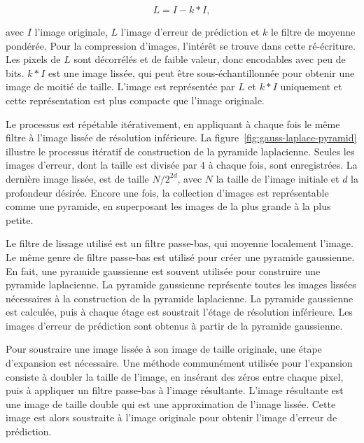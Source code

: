 \begin{equation}
    L = I - k * I,
\end{equation}

avec $I$ l'image originale, $L$ l'image d'erreur de prédiction et $k$ le filtre de moyenne pondérée. Pour la compression d'images, l'intérêt se trouve dans cette ré-écriture. Les pixels de $L$ sont décorrélés et de faible valeur, donc encodables avec peu de bits. $k*I$ est une image lissée, qui peut être sous-échantillonnée pour obtenir une image de moitié de taille. L'image est représentée par $L$ et $k*I$ uniquement et cette représentation est plus compacte que l'image originale.

\bigskip

Le processus est répétable itérativement, en appliquant à chaque fois le même filtre à l'image lissée de résolution inférieure. La figure~\ref{fig:gauss-laplace-pyramid} illustre le processus itératif de construction de la pyramide laplacienne. Seules les images d'erreur, dont la taille est divisée par 4 à chaque fois, sont enregistrées. La dernière image lissée, est de taille $N/2^{2d}$, avec $N$ la taille de l'image initiale et $d$ la profondeur désirée. Encore une fois, la collection d'images est représentable comme une pyramide, en superposant les images de la plus grande à la plus petite.

\bigskip

Le filtre de lissage utilisé est un filtre passe-bas, qui moyenne localement l'image. Le même genre de filtre passe-bas est utilisé pour créer une pyramide gaussienne. En fait, une pyramide gaussienne est souvent utilisée pour construire une pyramide laplacienne. La pyramide gaussienne représente toutes les images lissées nécessaires à la construction de la pyramide laplacienne. La pyramide gaussienne est calculée, puis à chaque étage est soustrait l'étage de résolution inférieure. Les images d'erreur de prédiction sont obtenus à partir de la pyramide gaussienne.

\bigskip

Pour soustraire une image lissée à son image de taille originale, une étape d'expansion est nécessaire. Une méthode communément utilisée pour l'expansion consiste à doubler la taille de l'image, en insérant des zéros entre chaque pixel, puis à appliquer un filtre passe-bas à l'image résultante. L'image résultante est une image de taille double qui est une approximation de l'image lissée. Cette image est alors soustraite à l'image originale pour obtenir l'image d'erreur de prédiction.


